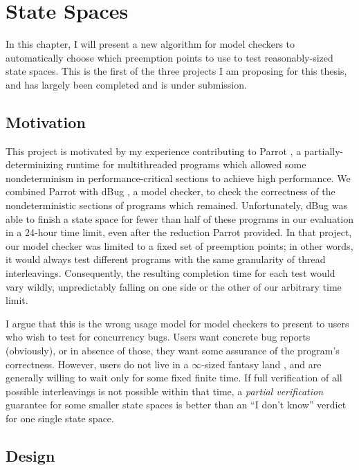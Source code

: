 \chapter{State Spaces}
\label{chap:quicksand}

In this chapter, I will present a new algorithm for model checkers to automatically choose which preemption points to use to test reasonably-sized state spaces.
This is the first of the three projects I am proposing for this thesis, and has largely been completed and is under submission.

\section{Motivation}

This project is motivated by my experience contributing to Parrot \cite{parrot},
a partially-determinizing runtime for multithreaded programs which allowed some nondeterminism in performance-critical sections to achieve high performance.
We combined Parrot with dBug \cite{dbug-ssv}, a model checker, to check the correctness of the nondeterministic sections of programs which remained.
Unfortunately, dBug was able to finish a state space for fewer than half of these programs in our evaluation in a 24-hour time limit,
even after the reduction Parrot provided.
In that project, our model checker was limited to a fixed set of preemption points;
in other words, it would always test different programs with the same granularity of thread interleavings.
Consequently, the resulting completion time for each test would vary wildly,
unpredictably falling on one side or the other of our arbitrary time limit.

I argue that this is the wrong usage model for model checkers to present to users who wish to test for concurrency bugs.
Users want concrete bug reports (obviously), or in absence of those, they want some assurance of the program's correctness.
However, users do not live in a $\infty$-sized fantasy land \cite{vargomax},
and are generally willing to wait only for some fixed finite time.
If full verification of all possible interleavings is not possible within that time,
a {\em partial verification} guarantee for some smaller state spaces is better than an ``I don't know'' verdict for one single state space.

\section{Design}

